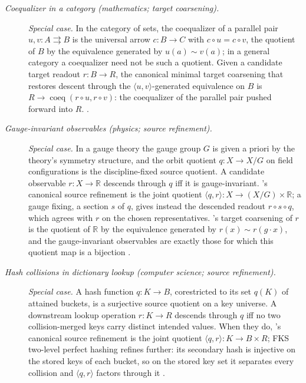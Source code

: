 \begingroup\small
\begin{description}
\item[\emph{Coequalizer in a category (mathematics; target
coarsening).}] \textit{Special case.}
In the category of sets, the coequalizer of a parallel pair
\(u, v : A \rightrightarrows B\) is the universal arrow
\(c : B \to C\) with \(c \circ u = c \circ v\), the quotient of \(B\)
by the equivalence generated by \(u(a)\sim v(a)\); in a general
category a coequalizer need not be such a quotient. Given a candidate target readout \(r : B \to R\), the
canonical minimal target coarsening that restores descent through
the \(\langle u, v\rangle\)-generated equivalence on \(B\) is
\(R \to \operatorname{coeq}(r \circ u, r \circ v)\): the
coequalizer of the parallel pair pushed forward into \(R\).
\citep{MacLane1998Categories}.

\item[\emph{Gauge-invariant observables (physics; source
refinement).}] \textit{Special case.}
In a gauge theory the gauge group \(G\) is given a priori by the
theory's symmetry structure, and the orbit quotient
\(q : X \to X/G\) on field configurations is the discipline-fixed
source quotient. A candidate observable \(r : X \to \mathbb{R}\)
descends through \(q\) iff it is gauge-invariant. 's canonical
source refinement is the joint quotient
\(\langle q, r\rangle : X \to (X/G) \times \mathbb{R}\); a gauge fixing, a section \(s\) of \(q\), gives instead the descended readout \(r\circ s\circ q\), which agrees with \(r\) on the chosen representatives. 's target
coarsening of \(r\) is the quotient of \(\mathbb{R}\) by the
equivalence generated by \(r(x)\sim r(g\cdot x)\), and the
gauge-invariant observables are exactly those for which this
quotient map is a bijection
\citep{PeskinSchroeder1995QFT}.

\item[\emph{Hash collisions in dictionary lookup (computer
science; source refinement).}] \textit{Special case.}
A hash function \(q : K \to B\), corestricted to its set \(q(K)\) of attained
buckets, is a surjective source quotient on a key universe. A downstream lookup operation
\(r : K \to R\) descends through \(q\) iff no two collision-merged
keys carry distinct intended values. When they do, 's canonical
source refinement is the joint quotient
\(\langle q, r\rangle : K \to B \times R\); FKS two-level perfect
hashing refines further: its secondary hash is injective on the
stored keys of each bucket, so on the stored key set it separates
every collision and \(\langle q, r\rangle\) factors through it
\citep{CormenLeisersonRivestStein2009CLRS}.


\end{description}
